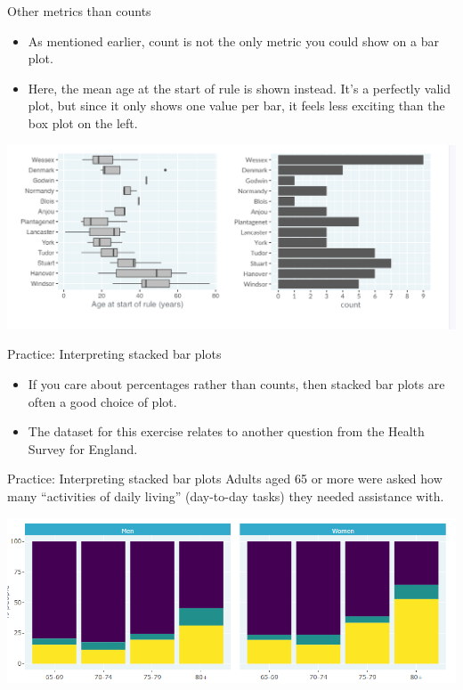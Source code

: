 \documentclass[
  ignorenonframetext,
]{beamer}
\begin{document}
\begin{frame}{Other metrics than counts}
\label{other-metrics-than-counts}
\begin{itemize}
\item
  As mentioned earlier, count is not the only metric you could show on a
  bar plot.
\item
  Here, the mean age at the start of rule is shown instead. It's a
  perfectly valid plot, but since it only shows one value per bar, it
  feels less exciting than the box plot on the left.
\end{itemize}

\includegraphics{../images/im56.png}
\end{frame}

\begin{frame}{Practice: Interpreting stacked bar plots}
\label{practice-interpreting-stacked-bar-plots}
\begin{itemize}
\item
  If you care about percentages rather than counts, then stacked bar
  plots are often a good choice of plot.
\item
  The dataset for this exercise relates to another question from the
  Health Survey for England.
\end{itemize}
\end{frame}

\begin{frame}{Practice: Interpreting stacked bar plots}
\label{practice-interpreting-stacked-bar-plots-1}
Adults aged 65 or more were asked how many ``activities of daily
living'' (day-to-day tasks) they needed assistance with.

\includegraphics{../images/im57.png}
\end{frame}
\end{document}
